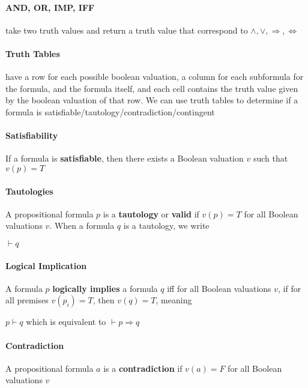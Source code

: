         \paragraph{AND, OR, IMP, IFF} take two truth values and return a truth
        value that correspond to $\land, \lor, \Rightarrow, \Leftrightarrow$

        \paragraph{Truth Tables} have a row for each possible boolean valuation,
          a column for each subformula for the formula, and the formula itself,
          and each cell contains the truth value given by the boolean valuation
          of that row. We can use truth tables to determine if a formula is
          satisfiable/tautology/contradiction/contingent

        \paragraph{Satisfiability} If a formula is \textbf{satisfiable}, then
        there exists a Boolean valuation $v$ such that $v(p) = T$

        \paragraph{Tautologies} A propositional formula $p$ is a
        \textbf{tautology} or \textbf{valid} if $v(p) = T$ for all Boolean
        valuations $v$. When a formula $q$ is a tautology, we write
        \begin{center}
           $\vdash q$
        \end{center}

        \paragraph{Logical Implication} A formula $p$ \textbf{logically
        implies} a formula $q$ iff for all Boolean valuations $v$, if for all
        premises $v(p_i) =
        T$, then $v(q) = T$, meaning
        \begin{center}
          $p \vdash q$ which is equivalent to $\vdash p \Rightarrow q$
        \end{center}

        \paragraph{Contradiction} A propositional formula $a$ is a
        \textbf{contradiction} if $v(a) = F$ for all Boolean valuations $v$

